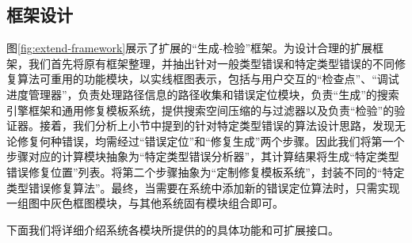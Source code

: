 

\subsection{框架设计}%

图\ref{fig:extend-framework}展示了扩展的“生成-检验”框架。为设计合理的扩展框架，我们首先将原有框架整理，并抽出针对一般类型错误和特定类型错误的不同修复算法可重用的功能模块，以实线框图表示，包括与用户交互的“检查点”、“调试进度管理器”，负责处理路径信息的路径收集和错误定位模块，负责“生成”的搜索引擎框架和通用修复模板系统，提供搜索空间压缩的与过滤器以及负责“检验”的验证器。接着，我们分析上小节中提到的针对特定类型错误的算法设计思路，发现无论修复何种错误，均需经过“错误定位”和“修复生成”两个步骤。因此我们将第一个步骤对应的计算模块抽象为“特定类型错误分析器”，其计算结果将生成“特定类型错误修复位置”列表。将第二个步骤抽象为“定制修复模板系统”，封装不同的“特定类型错误修复算法”。最终，当需要在系统中添加新的错误定位算法时，只需实现一组图中灰色框图模块，与其他系统固有模块组合即可。

下面我们将详细介绍系统各模块所提供的的具体功能和可扩展接口。

